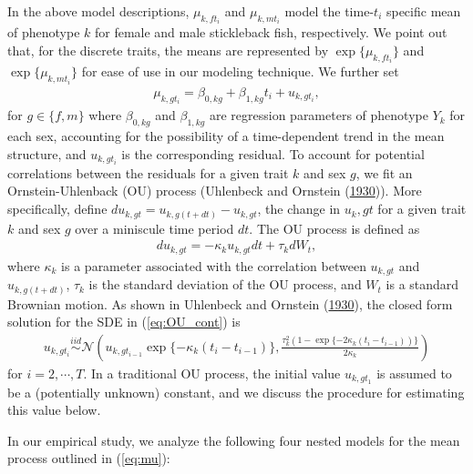 \documentclass[
  12pt,
]{article}
\begin{document}
In the above model descriptions, \(\mu_{k,ft_i}\) and \(\mu_{k,mt_i}\)
model the time-\(t_i\) specific mean of phenotype \(k\) for female and
male stickleback fish, respectively. We point out that, for the discrete
traits, the means are represented by \(\exp\{\mu_{k,ft_i}\}\) and
\(\exp\{\mu_{k,mt_i}\}\) for ease of use in our modeling technique. We
further set \begin{align}
\mu_{k,gt_i} = \beta_{0,kg} + \beta_{1,kg}t_i + u_{k,gt_i},
\label{eq:mu}
\end{align} for \(g \in \{f,m\}\) where \(\beta_{0,kg}\) and
\(\beta_{1,kg}\) are regression parameters of phenotype \(Y_k\) for each
sex, accounting for the possibility of a time-dependent trend in the
mean structure, and \(u_{k,gt_i}\) is the corresponding residual. To
account for potential correlations between the residuals for a given
trait \(k\) and sex \(g\), we fit an Ornstein-Uhlenback (OU) process
(Uhlenbeck and Ornstein (\protect\hyperlink{ref-OUProcess}{1930})). More
specifically, define \(du_{k,gt} = u_{k,g(t + dt)} - u_{k,gt}\), the
change in \(u_k,gt\) for a given trait \(k\) and sex \(g\) over a
miniscule time period \(dt\). The OU process is defined as \begin{align}
du_{k,gt} = -\kappa_k u_{k,gt} dt + \tau_k dW_t,
\label{eq:OU_cont}
\end{align} where \(\kappa_k\) is a parameter associated with the
correlation between \(u_{k,gt}\) and \(u_{k,g(t+dt)}\), \(\tau_k\) is
the standard deviation of the OU process, and \(W_t\) is a standard
Brownian motion. As shown in Uhlenbeck and Ornstein
(\protect\hyperlink{ref-OUProcess}{1930}), the closed form solution for
the SDE in (\ref{eq:OU_cont}) is \begin{align}
u_{k,gt_i} \overset{iid}{\sim}\mathcal{N}\left(u_{k,gt_{i-1}}\exp\{-\kappa_k(t_{i} - t_{i-1})\} , \frac{\tau_k^2(1 - \exp\{-2\kappa_k(t_{i} - t_{i-1}))\}}{2\kappa_k}\right)
\label{eq:OU_sol}
\end{align} for \(i = 2,\cdots,T\). In a traditional OU process, the
initial value \(u_{k,gt_1}\) is assumed to be a (potentially unknown)
constant, and we discuss the procedure for estimating this value below.

In our empirical study, we analyze the following four nested models for
the mean process outlined in (\ref{eq:mu}):
\end{document}
